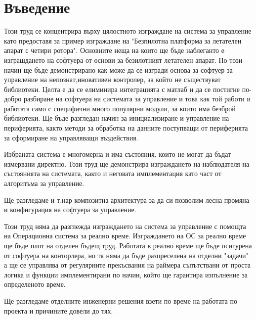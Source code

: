 \section{Въведение}

Този труд се концентрира върху цялостното изграждане на система за управление като предоставя
за пример изграждане на "Безпилотна платформа за летателен апарат с четири ротора".
Основните неща на които ще бъде наблеганто е изграшдането на софтуера от основи за безилотният летателен апарат.
По този начин ще бъде демонстрирано как може да се изгради основа за софтуер за управление на непознат,иновативен контролер, за който не съществуват библиотеки. 
Целта е да се елиминира интеграцията с матлаб и да се постигне по-добро разбиране на софтуера на системата за управление и това как той работи и работата само с специфични много популярни модули, за които има безброй библиотеки. Ще бъде разгледан начин за инициализиране и управление на периферията, както методи за обработка на данните поступващи от периферията за сформиране на управляващи въздействия.

Избраната система е многомерна и има състояния, които не могат да бъдат измервани директно.
Този труд ще демонстрира изграждането на наблюдателя на състоянията на системата, както и неговата имплементация като част от алгоритъма за управление. 

Ще разгледаме и т.нар композитна архитектура за да си позволим лесна промяна и конфигурация на софтуера за управление.

Този труд няма да разглежда изграждането на система за управление с помощта на Операционна система за реално време. Изграждането на ОС за реално време ще бъде плот на отделен бъдещ труд.
Работата в реално време ще бъде осигурена от софтуера на конторлера, но тя няма да бъде разпреселена на отделни "задачи" а ще се управлява от регулярните прекъсвания на раймера съпътствани от проста логика и функции имплементирани по начин, който ще гарантира изпълнение за определеното време.


Ще разгледаме отделните инженерни решения взети по време на работата по проекта и причините довели до тях.
